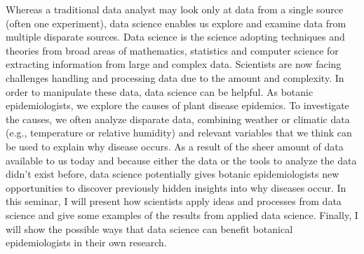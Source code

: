 \documentclass[12pt,a4paper]{article}
\begin{document}
Whereas a traditional data analyst may look only at data from a single source (often one experiment), data science enables us explore and examine data from multiple disparate sources. Data science is the science adopting techniques and theories from broad areas of mathematics, statistics and computer science for extracting information from large and complex data. Scientists are now facing challenges handling and processing data due to the amount and complexity. In order to manipulate these data, data science can be helpful.  As botanic epidemiologists, we explore the causes of plant disease epidemics. To investigate the causes, we often analyze disparate data, combining weather or climatic data (e.g., temperature or relative humidity) and relevant variables that we think can be used to explain why disease occurs. As a result of the sheer amount of data available to us today and because either the data or the tools to analyze the data didn't exist before, data science potentially gives botanic epidemiologists new opportunities to discover previously hidden insights into why diseases occur. In this seminar, I will present how scientists apply ideas and processes from data science and give some examples of the results from applied data science. Finally, I will show the possible ways that data science can benefit botanical epidemiologists in their own research.
\end{document}

